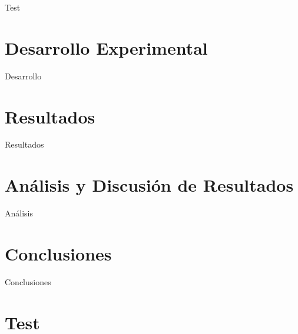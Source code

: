 \documentclass{replab}
\begin{document}
Test    \cite{oda}

	\section{Desarrollo Experimental}

Desarrollo

	\section{Resultados}

Resultados

    \section{Análisis y Discusión de Resultados}

    Análisis

	\section{Conclusiones}

    Conclusiones

\printbibliography[heading=bibintoc]

\clearpage

{
\onecolumn
\appendix
{}

\section{Test}

}
\end{document}
